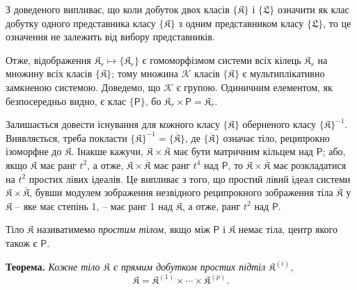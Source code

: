 \documentclass[11pt]{article}
\begin{document}
З доведеного випливає, що коли добуток двох класів \(\{\mathfrak K\}\) і \(\{\mathfrak L\}\) означити як клас добутку одного представника класу \(\{\mathfrak K\}\) з одним представником класу \(\{\mathfrak L\}\), то це означення не залежить від вибору представників.

Отже, відображення \(\mathfrak K_r\mapsto\{\mathfrak K_r\}\) є гомоморфізмом системи всіх кілець \(\mathfrak K_r\) на множину всіх класів \(\{\mathfrak K\}\); тому множина \(\mathscr K\) класів \(\{\mathfrak K\}\) є мультиплікативно замкненою системою. Доведемо, що \(\mathscr K\) є групою. Одиничним елементом, як безпосередньо видно, є клас \(\{\mathsf P\}\), бо \(\mathfrak K_r\times\mathsf P=\mathfrak K_r\).

Залишається довести існування для кожного класу \(\{\mathfrak K\}\) оберненого класу \(\{\mathfrak K\}^{-1}\). Виявляється, треба покласти \(\{\mathfrak K\}^{-1}=\{\overline{\mathfrak K}\}\), де \(\{\overline{\mathfrak K}\}\) означає тіло, реципрокно ізоморфне до \(\mathfrak K\). Інакше кажучи, \(\mathfrak K\times\overline{\mathfrak K}\) має бути матричним кільцем над \(\mathsf P\); або, якщо \(\mathfrak K\) має ранг \(t^2\), а отже, \(\mathfrak K\times\overline{\mathfrak K}\) має ранг \(t^4\) над \(\mathsf P\), то \(\mathfrak K\times\overline{\mathfrak K}\) має розкладатися на \(t^2\) простих лівих ідеалів. Це випливає з того, що простий лівий ідеал системи \(\mathfrak K\times\overline{\mathfrak K}\), бувши модулем зображення незвідного реципрокного зображення тіла \(\overline{\mathfrak K}\) у \(\mathfrak K\) -- яке має степінь 1, -- має ранг 1 над \(\mathfrak K\), а отже, ранг \(t^2\) над \(\mathsf P\).

Тіло \(\mathfrak K\) називатимемо \emph{простим тілом}, якщо між \(\mathsf P\) і \(\mathfrak K\) немає тіла, центр якого також є \(\mathsf P\).

\textbf{Теорема.} \emph{Кожне тіло \(\mathfrak K\) є прямим добутком простих підтіл \(\mathfrak K^{(i)}\),}
\[
\mathfrak K=\mathfrak K^{(1)}\times\cdots\times\mathfrak K^{(p)}.
\]
\end{document}
